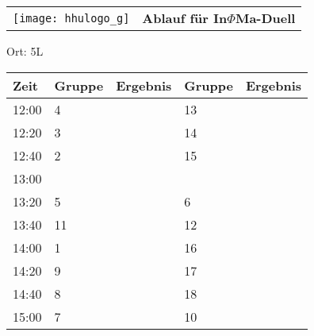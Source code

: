 \documentclass[a4paper,10pt]{article}
\def\spield{In$\Phi $Ma-Duell}
\def\raumd{5L}
\begin{document}
  \begin{tabularx}{\textwidth}{lc}
    \texttt{[image: hhulogo\_g]}
  & {\Huge \textbf{Ablauf für \spield}}
  \end{tabularx}
  \LARGE
  \begin{center}
    \vspace{1cm} 
    Ort: \raumd
  \end{center}
    \vspace{2cm} 
    \begin{tabularx}{\textwidth}{X||X|X||X|X}
	\textbf{Zeit} &\textbf{Gruppe} & \textbf{Ergebnis} &\textbf{Gruppe} & \textbf{Ergebnis}  	\\ \hline \hline
	12:00 &	4	&	&13	&	\\ \hline
	12:20 &	3	&	&14	&	\\ \hline
	12:40 &	2	&	&15	&	\\ \hline

	13:00 &	 	&	&	&	\\ \hline
	13:20 &	5	&	&6	&	\\ \hline
	13:40 &	11	&	&12	&	\\ \hline

	14:00 &	1	&	&16	&	\\ \hline
	14:20 &	9	&	&17	&	\\ \hline
	14:40 &	8	&	&18	&	\\ \hline

	15:00 &	7	&	&10	&	\\ \hline
      
    \end{tabularx}
   
   \newpage
\end{document}
